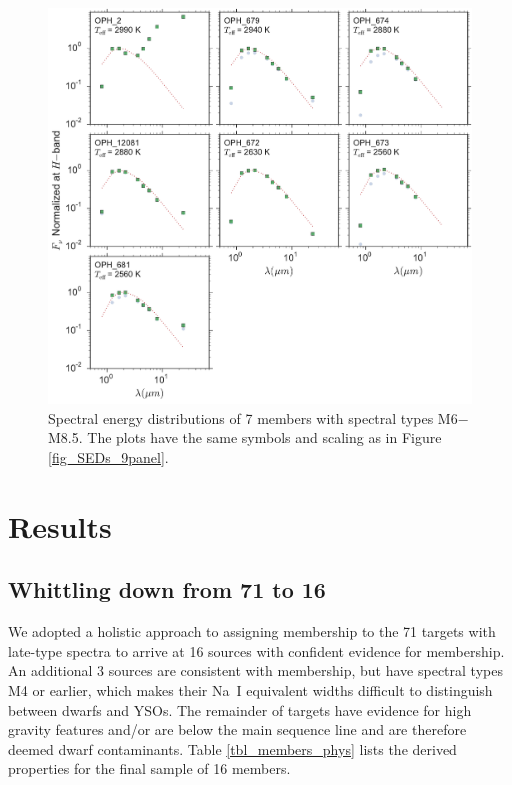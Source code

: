 \begin{figure}[ht!]
  \caption{ Spectral energy distributions of 7 members with spectral types M6$-$M8.5.  The plots have the same symbols and scaling as in Figure \ref{fig_SEDs_9panel}.  \label{fig_SEDs_7panel} }
\centering
\includegraphics[scale=0.6]{chIMACS/figures/SEDS_7panel}
\end{figure}

\section{Results}
\subsection{Whittling down from 71 to 16}
We adopted a holistic approach to assigning membership to the 71 targets with late-type spectra to arrive at 16 sources with confident evidence for membership.  An additional 3 sources are consistent with membership, but have spectral types M4 or earlier, which makes their Na~I equivalent widths difficult to distinguish between dwarfs and YSOs.  The remainder of targets have evidence for high gravity features and/or are below the main sequence line and are therefore deemed dwarf contaminants.  Table \ref{tbl_members_phys} lists the derived properties for the final sample of 16 members.  


